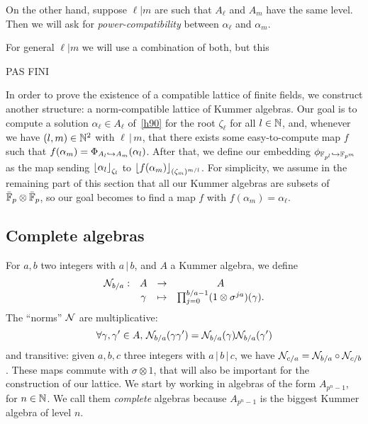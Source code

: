\documentclass{sig-alternate}
\begin{document}
On the other hand, suppose $\ell|m$ are such that $A_\ell$ and $A_m$ have the same level.
Then we will ask for \emph{power-compatibility} between $\alpha_{\ell}$ and $\alpha_{m}$.

For general $\ell|m$ we will use a combination of both, but this

PAS FINI


In order to prove the existence of a compatible lattice of finite fields,
we construct another structure: a norm-compatible lattice of
Kummer algebras. Our goal is to compute a solution $\alpha_\ell\in A_\ell$
of~\eqref{h90} for the root $\zeta_\ell$ for all $l\in\mathbb{N}$, and,
whenever we have $(l, m)\in\mathbb{N}^2$ with $\ell\,|\,m$, that there exists
some easy-to-compute map $f$ such that $f(\alpha_m) =
\Phi_{A_{l}\hookrightarrow A_{m}}(\alpha_l)$. After that, we define our embedding
$\phi_{\mathbb{F}_{p^{l}}\hookrightarrow\mathbb{F}_{p^{m}}}$ as the map sending $\left\lfloor \alpha_l \right\rfloor_{\zeta_l}$ to
$\left\lfloor f(\alpha_m) \right\rfloor_{(\zeta_m)^{m/l}}$. For simplicity, we assume in the
remaining part of this section that all our Kummer algebras are subsets of
$\bar{\mathbb{F}}_{p}\otimes\bar{\mathbb{F}}_p$, so our goal becomes to find a map
$f$ with $f(\alpha_m) = \alpha_\ell$.

\subsection{Complete algebras}

For $a, b$ two integers with $a\,|\,b$, and $A$ a Kummer
algebra, we define
\[
\begin{array}{cccc}
  \mathcal{N}_{b/a}: & A & \to & A \\
  & \gamma & \mapsto & \prod_{j=0}^{b/a-1} (1 \otimes
  \sigma^{ja})(\gamma).
\end{array}
\]
The ``norms'' $\mathcal{N}$ are multiplicative:
\[
  \forall\gamma, \gamma'\in A,\,\mathcal{N}_{b/a}(\gamma\gamma')=\mathcal{N}_{b/a}(\gamma)\mathcal{N}_{b/a}(\gamma')
\]
and transitive: given $a, b, c$ three integers with
$a\,|\,b\,|\,c$, we have $\mathcal{N}_{c/a} = \mathcal{N}_{b/a}\circ\mathcal{N}_{c/b}$. These maps 
commute with $\sigma\otimes1$, that will also be important for the construction
of our lattice. We start by working in algebras of the form $A_{p^n-1}$, for
$n\in\mathbb{N}$. We call them \emph{complete} algebras because
$A_{p^n-1}$ is the biggest Kummer algebra of level $n$.
\end{document}
